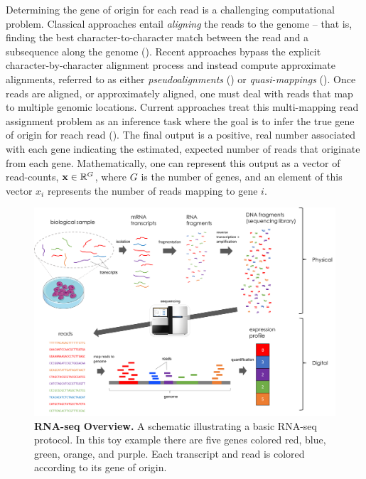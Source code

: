 Determining the gene of origin for each read is a challenging computational problem. Classical approaches entail \textit{aligning} the reads to the genome -- that is, finding the best character-to-character match between the read and a subsequence along the genome (\citealp{Canzar2017}).  Recent approaches bypass the explicit character-by-character alignment process and instead compute approximate alignments, referred to as either \textit{pseudoalignments} (\citealp{Bray2016}) or \textit{quasi-mappings} (\citealp{Patro2017}).  Once reads are aligned, or approximately aligned, one must deal with reads that map to multiple genomic locations.  Current approaches treat this multi-mapping read assignment problem as an inference task where the goal is to infer the true gene of origin for reach read (\citealp{Li2011, Li2010}).  The final output is a positive, real number associated with each gene indicating the estimated, expected number of reads that originate from each gene.  Mathematically, one can represent this output as a vector of read-counts, $\bold{x} \in \mathbb{R}^G$, where $G$ is the number of genes, and an element of this vector $x_i$ represents the number of reads mapping to gene $i$.


\begin{figure}[!tpb]
\centerline{\includegraphics[scale=0.35]{figures/RNA_seq_schematic.png}}
\caption{\textbf{RNA-seq Overview.} A schematic illustrating a basic RNA-seq protocol. In this toy example there are five genes colored red, blue, green, orange, and purple. Each transcript and read is colored according to its gene of origin.}
\label{fig:rna_seq_protocol}
\end{figure}


